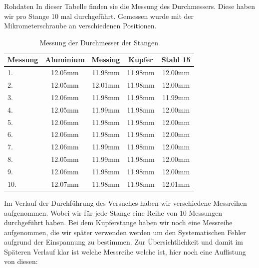 \documentclass[twoside]{protokoll}
\begin{document}
\begin{aufgabe}{Rohdaten}
In dieser Tabelle finden sie die Messung des Durchmessers. Diese haben wir pro Stange 10 mal durchgeführt. Gemessen wurde mit der Mikrometerschraube an verschiedenen Positionen.\\
    \begin{table}[H]
        \centering
        \begin{tabularx}{0.8\textwidth}{X c c c c} %
            \toprule
            \textbf{Messung} & \textbf{Aluminium} & \textbf{Messing} & \textbf{Kupfer} & \textbf{Stahl 15} \\
            \midrule
            1. & 12.05mm & 11.98mm & 11.98mm & 12.00mm \\
            2. & 12.05mm & 12.01mm & 11.98mm & 12.00mm \\
            3. & 12.06mm & 11.98mm & 11.98mm & 11.99mm \\
            4. & 12.05mm & 11.99mm & 11.98mm & 12.00mm \\
            5. & 12.06mm & 11.98mm & 11.98mm & 12.00mm \\
            6. & 12.06mm & 11.98mm & 11.98mm & 12.00mm \\
            7. & 12.06mm & 11.99mm & 11.98mm & 12.00mm \\
            8. & 12.05mm & 11.99mm & 11.98mm & 12.00mm \\
            9. & 12.06mm & 11.98mm & 11.98mm & 12.00mm \\
            10.& 12.07mm & 11.98mm & 11.98mm & 12.01mm \\
            \bottomrule
        \end{tabularx}
        \caption{Messung der Durchmesser der Stangen}
        \label{tab:mytable}
    \end{table}

Im Verlauf der Durchführung des Versuches haben wir verschiedene Messreihen aufgenommen.
Wobei wir für jede Stange eine Reihe von 10 Messungen durchgeführt haben. Bei dem Kupferstange haben wir noch eine Messreihe aufgenommen, die wir später verwenden werden um den Systematischen Fehler aufgrund der Einspannung zu bestimmen.
Zur Übersichtlichkeit und damit im Späteren Verlauf klar ist welche Messreihe welche ist, hier noch eine Auflistung von diesen:\\


\end{aufgabe}
\end{document}
